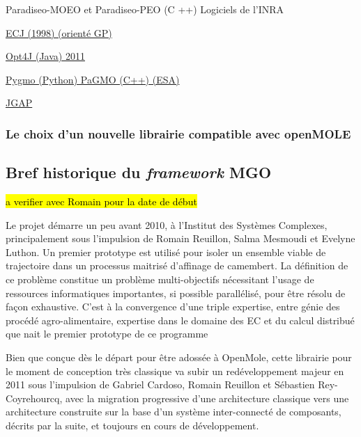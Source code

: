 Paradiseo-MOEO et Paradiseo-PEO (C ++)
Logiciels de l'INRA

\href{http://cs.gmu.edu/~eclab/projects/ecj/}{ECJ (1998) (orienté GP)}

\href{http://opt4j.sourceforge.net/}{Opt4J (Java) 2011}

\href{http://esa.github.io/pygmo/}{Pygmo (Python) PaGMO (C++) (ESA)}

\href{http://jgap.sourceforge.net/}{JGAP}


\subsubsection{Le choix d'un nouvelle librairie compatible avec openMOLE}



\subsection{Bref historique du \textit{framework} MGO}

\hl{a verifier avec Romain pour la date de début}

Le projet démarre un peu avant 2010, à l'Institut des Systèmes Complexes, principalement sous l'impulsion de Romain Reuillon, Salma Mesmoudi et Evelyne Luthon. Un premier prototype est utilisé pour isoler un ensemble viable de trajectoire dans un processus maitrisé d'affinage de camembert. La définition de ce problème constitue un problème multi-objectifs nécessitant l'usage de ressources informatiques importantes, si possible parallélisé, pour être résolu de façon exhaustive. C'est à la convergence d'une triple expertise, entre génie des procédé agro-alimentaire, expertise dans le domaine des EC et du calcul distribué que nait le premier prototype de ce programme \autocite{Mesmoudi2010}

Bien que conçue dès le départ pour être adossée à OpenMole, cette librairie pour le moment de conception très classique va subir un redéveloppement majeur en 2011 sous l'impulsion de Gabriel Cardoso, Romain Reuillon et Sébastien Rey-Coyrehourcq, avec la migration progressive d'une architecture classique vers une architecture construite sur la base d'un système inter-connecté de composants, décrits par la suite, et toujours en cours de développement. 

